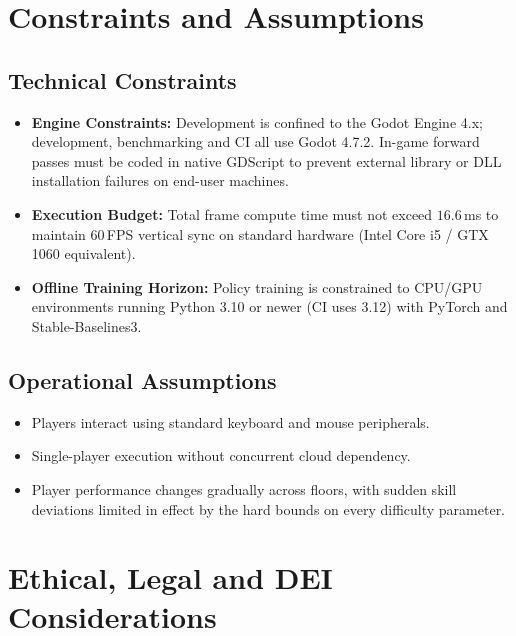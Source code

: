 \section{Constraints and Assumptions}
\subsection*{Technical Constraints}
\begin{itemize}
    \item \textbf{Engine Constraints:} Development is confined to the Godot Engine 4.x; development, benchmarking and CI all use Godot 4.7.2. In-game forward passes must be coded in native GDScript to prevent external library or DLL installation failures on end-user machines.
    \item \textbf{Execution Budget:} Total frame compute time must not exceed $16.6$\,ms to maintain 60\,FPS vertical sync on standard hardware (Intel Core i5 / GTX 1060 equivalent).
    \item \textbf{Offline Training Horizon:} Policy training is constrained to CPU/GPU environments running Python 3.10 or newer (CI uses 3.12) with PyTorch and Stable-Baselines3.
\end{itemize}

\subsection*{Operational Assumptions}
\begin{itemize}
    \item Players interact using standard keyboard and mouse peripherals.
    \item Single-player execution without concurrent cloud dependency.
    \item Player performance changes gradually across floors, with sudden skill deviations limited in effect by the hard bounds on every difficulty parameter.
\end{itemize}

\section{Ethical, Legal and DEI Considerations}\label{sec:ethics_intro}
